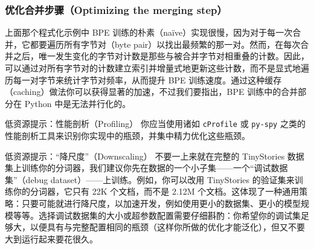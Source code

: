 \subsubsection*{优化合并步骤（Optimizing the merging step）}

上面那个程式化示例中 BPE 训练的朴素（naïve）实现很慢，因为对于每一次合并，它都要遍历所有字节对（byte pair）以找出最频繁的那一对。然而，在每次合并之后，唯一发生变化的字节对计数是那些与被合并字节对相重叠的计数。因此，可以通过对所有字节对的计数建立索引并增量式地更新这些计数，而不是显式地遍历每一对字节来统计字节对频率，从而提升 BPE 训练速度。通过这种缓存（caching）做法你可以获得显著的加速，不过我们要指出，BPE 训练中的合并部分在 Python 中是无法并行化的。

\begin{tipbox}{低资源提示：性能剖析（Profiling）}
你应当使用诸如 \texttt{cProfile} 或 \texttt{py-spy} 之类的性能剖析工具来识别你实现中的瓶颈，并集中精力优化这些瓶颈。
\end{tipbox}

\begin{tipbox}{低资源提示：“降尺度”（Downscaling）}
不要一上来就在完整的 TinyStories 数据集上训练你的分词器，我们建议你先在数据的一个小子集——一个“调试数据集”（debug dataset）——上训练。例如，你可以改用 TinyStories 的验证集来训练你的分词器，它只有 22K 个文档，而不是 2.12M 个文档。这体现了一种通用策略：只要可能就进行降尺度，以加速开发，例如使用更小的数据集、更小的模型规模等等。选择调试数据集的大小或超参数配置需要仔细斟酌：你希望你的调试集足够大，以便具有与完整配置相同的瓶颈（这样你所做的优化才能泛化），但又不要大到运行起来要花很久。
\end{tipbox}

